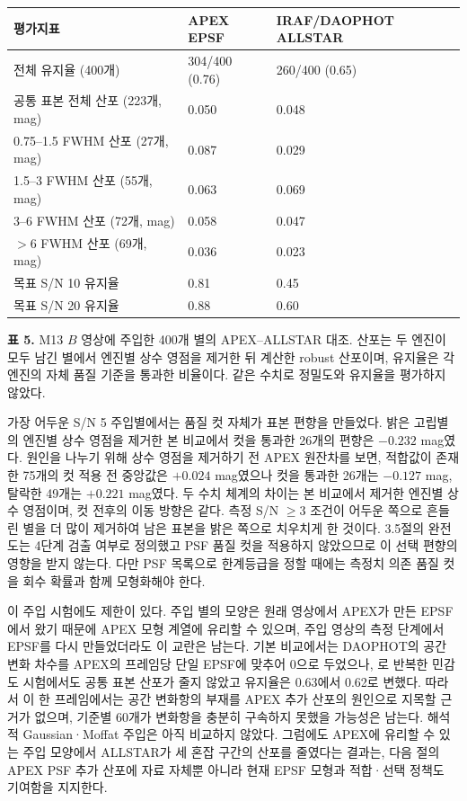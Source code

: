 \begin{table}[!t]
\centering\small
\begin{tabularx}{\textwidth}{XXX}
\toprule
평가지표 & APEX EPSF & IRAF/DAOPHOT ALLSTAR \\
\midrule
전체 유지율 (400개) & 304/400 (0.76) & 260/400 (0.65) \\
공통 표본 전체 산포 (223개, mag) & 0.050 & 0.048 \\
0.75–1.5 FWHM 산포 (27개, mag) & 0.087 & 0.029 \\
1.5–3 FWHM 산포 (55개, mag) & 0.063 & 0.069 \\
3–6 FWHM 산포 (72개, mag) & 0.058 & 0.047 \\
$>6$ FWHM 산포 (69개, mag) & 0.036 & 0.023 \\
목표 S/N 10 유지율 & 0.81 & 0.45 \\
목표 S/N 20 유지율 & 0.88 & 0.60 \\
\bottomrule
\end{tabularx}
\end{table}

\textbf{표 5.} M13 $B$ 영상에 주입한 400개 별의 APEX–ALLSTAR 대조. 산포는 두 엔진이 모두 남긴 별에서 엔진별 상수 영점을 제거한 뒤 계산한 robust 산포이며, 유지율은 각 엔진의 자체 품질 기준을 통과한 비율이다. 같은 수치로 정밀도와 유지율을 평가하지 않았다.



가장 어두운 S/N 5 주입별에서는 품질 컷 자체가 표본 편향을 만들었다. 밝은 고립별의 엔진별 상수 영점을 제거한 본 비교에서 컷을 통과한 26개의 편향은 $-0.232$ mag였다. 원인을 나누기 위해 상수 영점을 제거하기 전 APEX 원잔차를 보면, 적합값이 존재한 75개의 컷 적용 전 중앙값은 $+0.024$ mag였으나 컷을 통과한 26개는 $-0.127$ mag, 탈락한 49개는 $+0.221$ mag였다. 두 수치 체계의 차이는 본 비교에서 제거한 엔진별 상수 영점이며, 컷 전후의 이동 방향은 같다. 측정 S/N $\ge3$ 조건이 어두운 쪽으로 흔들린 별을 더 많이 제거하여 남은 표본을 밝은 쪽으로 치우치게 한 것이다. 3.5절의 완전도는 4단계 검출 여부로 정의했고 PSF 품질 컷을 적용하지 않았으므로 이 선택 편향의 영향을 받지 않는다. 다만 PSF 목록으로 한계등급을 정할 때에는 측정치 의존 품질 컷을 회수 확률과 함께 모형화해야 한다.



이 주입 시험에도 제한이 있다. 주입 별의 모양은 원래 영상에서 APEX가 만든 EPSF에서 왔기 때문에 APEX 모형 계열에 유리할 수 있으며, 주입 영상의 측정 단계에서 EPSF를 다시 만들었더라도 이 교란은 남는다. 기본 비교에서는 DAOPHOT의 공간 변화 차수를 APEX의 프레임당 단일 EPSF에 맞추어 0으로 두었으나, \texttt{}로 반복한 민감도 시험에서도 공통 표본 산포가 줄지 않았고 유지율은 0.63에서 0.62로 변했다. 따라서 이 한 프레임에서는 공간 변화항의 부재를 APEX 추가 산포의 원인으로 지목할 근거가 없으며, 기준별 60개가 변화항을 충분히 구속하지 못했을 가능성은 남는다. 해석적 Gaussian·Moffat 주입은 아직 비교하지 않았다. 그럼에도 APEX에 유리할 수 있는 주입 모양에서 ALLSTAR가 세 혼잡 구간의 산포를 줄였다는 결과는, 다음 절의 APEX PSF 추가 산포에 자료 자체뿐 아니라 현재 EPSF 모형과 적합·선택 정책도 기여함을 지지한다.



